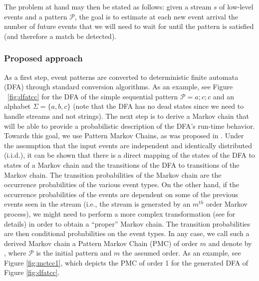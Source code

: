 The problem at hand may then be stated as follows: given a stream $s$ of low-level events and a pattern $\mathcal{P}$, 
the goal is to estimate at each new event arrival the number of future events
that we will need to wait for until the pattern is satisfied (and therefore a match be detected).

\subsubsection{Proposed approach}

As a first step, event patterns are converted to deterministic finite automata (DFA) through standard conversion algorithms.
As an example, see Figure ~\ref{fig:dfatcc} for the DFA of the simple sequential pattern $\mathcal{P}=a ; c ; c$ and an alphabet $\Sigma=\{a,b,c\}$
(note that the DFA has no dead states since we need to handle streams and not strings).
The next step is to derive a Markov chain that will be able to provide a probabilistic description of the DFA's run-time behavior.
Towards this goal, we use Pattern Markov Chains, as was proposed in \cite{nuel_pattern_2008}.
Under the assumption that the input events are independent and identically distributed (i.i.d.), it can be shown that there is a direct mapping of the states of the DFA to states of a Markov chain and the transitions of the DFA to transitions of the Markov chain.
The transition probabilities of the Markov chain are the occurrence probabilities of the various event types.
On the other hand, if the occurrence probabilities of the events are dependent on some of the previous events  seen in the stream (i.e., the stream is generated by an $m^{th}$ order Markov process), we might need to perform a more complex transformation 
(see \cite{nuel_pattern_2008} for details)
in order to obtain a ``proper'' Markov chain.
The transition probabilities are then conditional probabilities on the event types.
In any case,
we call such a derived Markov chain a Pattern Markov Chain (PMC) of order $m$
and denote by \pmcmr , where $\mathcal{P}$ is the initial pattern and $m$ the assumed order.
As an example, see Figure \ref{fig:mctcc1}, which depicts the PMC of order 1 for the generated DFA of Figure \ref{fig:dfatcc}.
